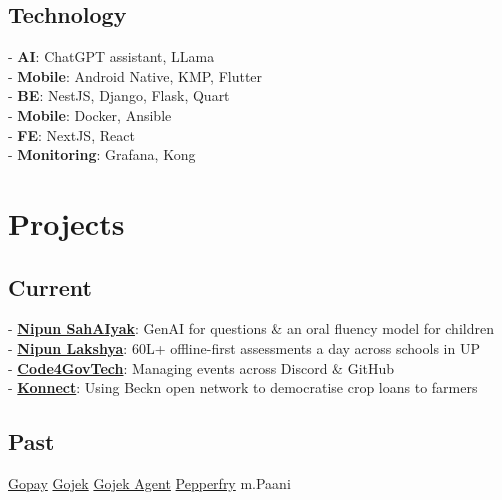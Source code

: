 \documentclass[]{deedy-resume-reversed}
\begin{document}
\begin{minipage}[t]{0.33\textwidth}
\subsection{Technology}
- {\bf AI}: ChatGPT assistant, LLama\\
- {\bf Mobile}: Android Native, KMP, Flutter \\ 
- {\bf BE}: NestJS, Django, Flask, Quart \\
- {\bf Mobile}: Docker, Ansible \\
- {\bf FE}: NextJS, React \\
- {\bf Monitoring}: Grafana, Kong \\
\sectionsep


\section{Projects}
\subsection{Current}
- \href{https://github.com/NipunSahAIyak}{{\bf Nipun SahAIyak}}: GenAI for questions \& an oral fluency model for children\\
- \href{https://github.com/Mission-Prerna}{{\bf Nipun Lakshya}}: 60L+ offline-first assessments a day across schools in UP\\
- \href{https://github.com/Code4GovTech}{{\bf Code4GovTech}}: Managing events across Discord \& GitHub\\
- \href{https://github.com/Konnect-Agri}{{\bf Konnect}}: Using Beckn open network to democratise crop loans to farmers
\sectionsep

\subsection{Past}
\href{https://play.google.com/store/apps/details?id=com.gojek.gopay&hl=en_IN}{Gopay} \textbullet{}
\href{https://play.google.com/store/apps/details?id=com.gojek.app&hl=en_IN}{Gojek} \textbullet{}
\href{https://play.google.com/store/apps/details?id=com.gojek.agent&hl=en_IN}{Gojek Agent} \textbullet{}
\href{https://play.google.com/store/apps/details?id=com.app.pepperfry&hl=en_IN}{Pepperfry} \textbullet{}
m.Paani\\



\end{minipage}
\end{document}
